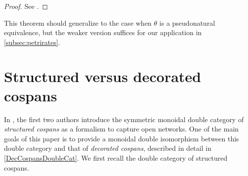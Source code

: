 \documentclass[reqno]{amsart}
\begin{document}
\begin{proof}  See \cite[Theorem 4.2.1]{CourserThesis}. \end{proof}

This theorem should generalize to the case when $\theta$ is a pseudonatural equivalence, but the weaker version suffices for our application in \cref{subsec:petrirates}.

\section{Structured versus decorated cospans} \label{EquivDoubleCats}

In \cite{BC}, the first two authors introduce the symmetric monoidal double category of \emph{structured cospans} as a formalism to capture open networks. One of the main goals of this paper is to provide a monoidal double isomorphism between this double category and that of \emph{decorated cospans}, described in detail in \cref{DecCospansDoubleCat}. We first recall the double category of structured cospans.
\end{document}
